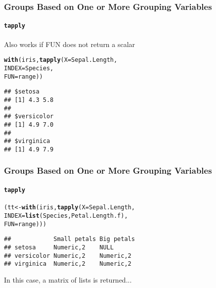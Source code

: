 \documentclass[paper=screen,mathserif]{beamer}\usepackage[]{graphicx}\usepackage[]{color}
\makeatletter
\newcommand{\hlstd}[1]{\textcolor[rgb]{0.345,0.345,0.345}{#1}}%
\newcommand{\hlkwb}[1]{\textcolor[rgb]{0.69,0.353,0.396}{#1}}%
\newcommand{\hlkwc}[1]{\textcolor[rgb]{0.333,0.667,0.333}{#1}}%
\newcommand{\hlkwd}[1]{\textcolor[rgb]{0.737,0.353,0.396}{\textbf{#1}}}%
\newenvironment{kframe}{%
 \def\at@end@of@kframe{}%
 \ifinner\ifhmode%
  \def\at@end@of@kframe{\end{minipage}}%
  \begin{minipage}{\columnwidth}%
 \fi\fi%
 \def\FrameCommand##1{\hskip\@totalleftmargin \hskip-\fboxsep
 \colorbox{shadecolor}{##1}\hskip-\fboxsep
     \hskip-\linewidth \hskip-\@totalleftmargin \hskip\columnwidth}%
 \MakeFramed {\advance\hsize-\width
   \@totalleftmargin\z@ \linewidth\hsize
   \@setminipage}}%
 {\par\unskip\endMakeFramed%
 \at@end@of@kframe}
\newenvironment{knitrout}{}{} %
\newcommand{\ft}[1]{\frametitle{#1}}
\newcommand{\fst}[1]{\framesubtitle{#1}}
\makeatother
\begin{document}
\begin{frame}[fragile]
  \ft{Groups Based on One or More Grouping Variables}
  \fst{{\tt tapply}}

  Also works if FUN does not return a scalar
\begin{knitrout}\scriptsize
{}\color{fgcolor}\begin{kframe}
\begin{alltt}
\hlkwd{with}\hlstd{(iris,} \hlkwd{tapply}\hlstd{(}\hlkwc{X} \hlstd{= Sepal.Length,}
                  \hlkwc{INDEX} \hlstd{= Species,}
                  \hlkwc{FUN} \hlstd{= range))}
\end{alltt}
\begin{verbatim}
## $setosa
## [1] 4.3 5.8
## 
## $versicolor
## [1] 4.9 7.0
## 
## $virginica
## [1] 4.9 7.9
\end{verbatim}
\end{kframe}
\end{knitrout}
\end{frame}

\begin{frame}[fragile]
  \ft{Groups Based on One or More Grouping Variables}
  \fst{{\tt tapply}}

\begin{knitrout}\scriptsize
{}\color{fgcolor}\begin{kframe}
\begin{alltt}
\hlstd{(tt} \hlkwb{<-} \hlkwd{with}\hlstd{(iris,} \hlkwd{tapply}\hlstd{(}\hlkwc{X} \hlstd{= Sepal.Length,}
                        \hlkwc{INDEX} \hlstd{=} \hlkwd{list}\hlstd{(Species, Petal.Length.f),}
                        \hlkwc{FUN} \hlstd{= range)))}
\end{alltt}
\begin{verbatim}
##            Small petals Big petals
## setosa     Numeric,2    NULL      
## versicolor Numeric,2    Numeric,2 
## virginica  Numeric,2    Numeric,2
\end{verbatim}
\end{kframe}
\end{knitrout}
In this case, a matrix of lists is returned...

\end{frame}
\end{document}
